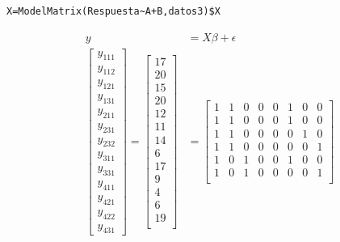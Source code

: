 \documentclass[12pt,a4paper]{report}
\begin{document}
\begin{verbatim}
X=ModelMatrix(Respuesta~A+B,datos3)$X
\end{verbatim}
\begin{align*}
y&=X\beta+\epsilon \\
\begin{bmatrix} y_{111} \\
                y_{112} \\
                y_{121} \\
                y_{131} \\
                y_{211} \\
                y_{231} \\
                y_{232} \\
                y_{311} \\
                y_{331} \\
                y_{411} \\
                y_{421} \\
                y_{422} \\
                y_{431}
\end{bmatrix}=
\begin{bmatrix} 17 \\
                20 \\
                15 \\
                20 \\
                12 \\
                11 \\
                14 \\
                6 \\
                17 \\
                9 \\
                4 \\
                6 \\
                19 \\
\end{bmatrix}
&=\begin{bmatrix} 1 & 1 & 0 & 0 & 0 & 1 & 0 & 0\\
                1 & 1 & 0 & 0 & 0 & 1 & 0 & 0\\
                1 & 1 & 0 & 0 & 0 & 0 & 1 & 0\\
                1 & 1 & 0 & 0 & 0 & 0 & 0 & 1\\
                1 & 0 & 1 & 0 & 0 & 1 & 0 & 0\\
                1 & 0 & 1 & 0 & 0 & 0 & 0 & 1\\

\end{bmatrix}
\end{align*}
\end{document}
